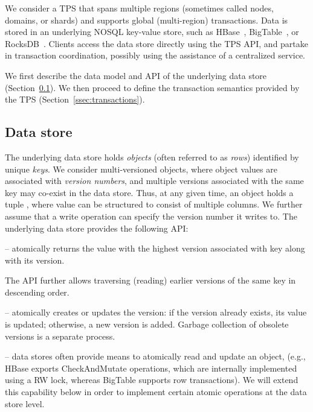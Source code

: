 
We consider a TPS  that spans multiple regions (sometimes called nodes, domains, or shards) and supports global
(multi-region) transactions. Data is stored in an underlying NOSQL key-value store, 
such as HBase~\cite{hbase}, BigTable~\cite{bigtable-osdi06},  or
RocksDB~\cite{rocksdb}. Clients access the data store directly using the TPS API, and partake in transaction
coordination, possibly using the assistance of a  centralized service.

We first describe the data model and API of the underlying data store (Section~\ref{ssec:data-model}).
We then proceed to define  the transaction semantics provided by the TPS (Section~\ref{ssec:transactions}). 

\subsection{Data store}
\label{ssec:data-model}

The underlying data store holds  \emph{objects} (often referred to as \emph{rows}) identified by unique \emph{keys}.
We consider multi-versioned objects, where object values are associated with \emph{version numbers}, and
multiple versions associated with the same key may co-exist in the data store.
Thus, at any given time, an object holds a tuple , where value
can be structured to consist of multiple columns.
We further assume that a write operation can specify the version number it writes to.
The underlying data store provides the following API:
\begin{description}
\item [] -- atomically returns the value with
the highest version associated with key along with its version.
\item The API further allows traversing (reading) earlier versions of the same
key in descending order.
\item [\code{write(key,value,version)}] -- atomically creates or updates the version:
if the version already exists, its value is updated;
otherwise, a new version is added. Garbage collection of obsolete versions is a separate
process.
\item [Read-modify-write] --  data stores often provide means to atomically read and
update an object, (e.g., HBase exports CheckAndMutate operations, which are 
internally implemented using a RW lock, whereas BigTable supports row transactions). We
will extend this capability below in order to implement certain atomic
operations at the data store level.
\end{description}

